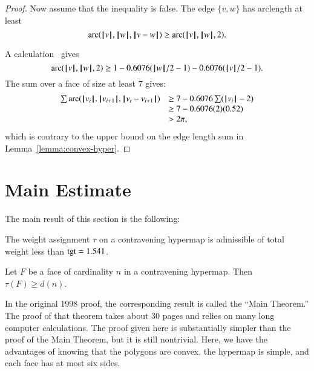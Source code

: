 {\begin{proof}
Now assume that the inequality is false.
The edge $\{v,w\}$ has arclength at least
$$
\arc(\normo{v},\normo{w},\norm{v}{w}) \ge \arc(\normo{v},\normo{w},2). 
$$

A calculation~\cite[cc:arc]{hales:2009:nonlinear} gives
$$\arc(\normo{v},\normo{w},2)\ge 1 - 0.6076 (\normo{w}/2 - 1) - 0.6076 (\normo{v}/2 - 1).$$ %
The sum over a face of size at least $7$ gives:
$$
\begin{array}{lll}
\sum \arc(\normo{v_i},\normo{v_{i+1}},\norm{v_i}{v_{i+1}})&\ge
7 - 0.6076 \sum (\normo{v_i}-2) \\
   &\ge 7 - 0.6076 (2) (0.52) \\
   &> 2\pi,
\end{array}
$$
which is contrary to the upper bound on the edge length
sum in Lemma~\ref{lemma:convex-hyper}.
\end{proof}



\section{Main Estimate}\label{sec:weight}


The main result of this section is the following:

\begin{theorem}  %
The weight assignment $\tau$ on a contravening hypermap is admissible of  total weight less than $\op{tgt}=1.541$.
\end{theorem}

\label{sec:admissibility}




\begin{lemma} %
Let $F$ be a face of cardinality $n$ in a contravening hypermap.  Then
        $\tau(F) \ge d(n)$.
\end{lemma}

In the original 1998 proof, the corresponding result
is called the ``Main Theorem.''  The proof of that 
theorem takes about 30 pages and relies on many
long computer calculations.  The proof given here
is substantially simpler than the proof of the
Main Theorem, but
it is still nontrivial.  Here, we have the advantages
of knowing that the polygons are convex, the hypermap
is simple, and each face has at most six sides.

}
